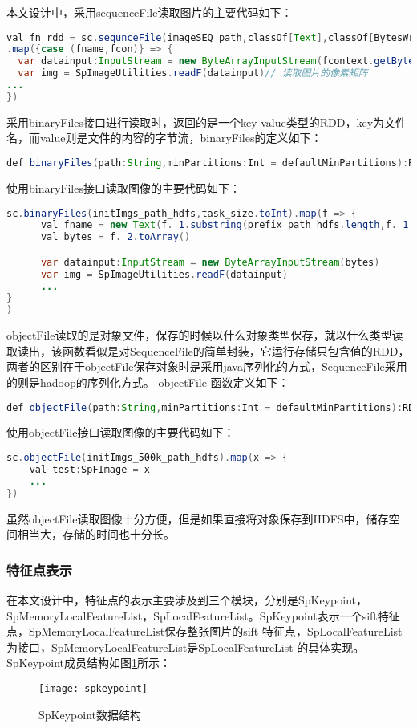 本文设计中，采用sequenceFile读取图片的主要代码如下：
\begin{lstlisting}[language=Java,numbers=none]
val fn_rdd = sc.sequnceFile(imageSEQ_path,classOf[Text],classOf[BytesWritable],task_size.toInt)
.map({case (fname,fcon)} => {
  var datainput:InputStream = new ByteArrayInputStream(fcontext.getBytes)
  var img = SpImageUtilities.readF(datainput)// 读取图片的像素矩阵
...
})
\end{lstlisting}
采用binaryFiles接口进行读取时，返回的是一个key-value类型的RDD，key为文件名，而value则是文件的内容的字节流，binaryFiles的定义如下：
\begin{lstlisting}[language=Java,numbers=none]
def binaryFiles(path:String,minPartitions:Int = defaultMinPartitions):RDD[(String,PortableDataStream)]=withScope{}
\end{lstlisting}
使用binaryFiles接口读取图像的主要代码如下：
\begin{lstlisting}[language=Java,numbers=none]
 sc.binaryFiles(initImgs_path_hdfs,task_size.toInt).map(f => {
      val fname = new Text(f._1.substring(prefix_path_hdfs.length,f._1.length))// 获取features key
      val bytes = f._2.toArray()

      var datainput:InputStream = new ByteArrayInputStream(bytes)
      var img = SpImageUtilities.readF(datainput)
      ...
}
)
\end{lstlisting}
objectFile读取的是对象文件，保存的时候以什么对象类型保存，就以什么类型读取读出，该函数看似是对SequenceFile的简单封装，它运行存储只包含值的RDD，两者的区别在于objectFile保存对象时是采用java序列化的方式，SequenceFile采用的则是hadoop的序列化方式。 objectFile 函数定义如下：
\begin{lstlisting}[language=Java,numbers=none]
def objectFile(path:String,minPartitions:Int = defaultMinPartitions):RDD[T]=withScope{}
\end{lstlisting}
使用objectFile接口读取图像的主要代码如下：
\begin{lstlisting}[language=Java,numbers=none,frame=none]
sc.objectFile(initImgs_500k_path_hdfs).map(x => {
    val test:SpFImage = x
    ...
})
\end{lstlisting}
虽然objectFile读取图像十分方便，但是如果直接将对象保存到HDFS中，储存空间相当大，存储的时间也十分长。
\subsubsection{特征点表示}
在本文设计中，特征点的表示主要涉及到三个模块，分别是SpKeypoint，SpMemoryLocalFeatureList，SpLocalFeatureList。SpKeypoint表示一个sift特征点，SpMemoryLocalFeatureList保存整张图片的sift 特征点，SpLocalFeatureList为接口，SpMemoryLocalFeatureList是SpLocalFeatureList 的具体实现。SpKeypoint成员结构如图\ref{fig:spkeypoint}所示：
\begin{figure}[htp]
\centering
\texttt{[image: spkeypoint]}
\caption{SpKeypoint数据结构}
\label{fig:spkeypoint}
\end{figure}

